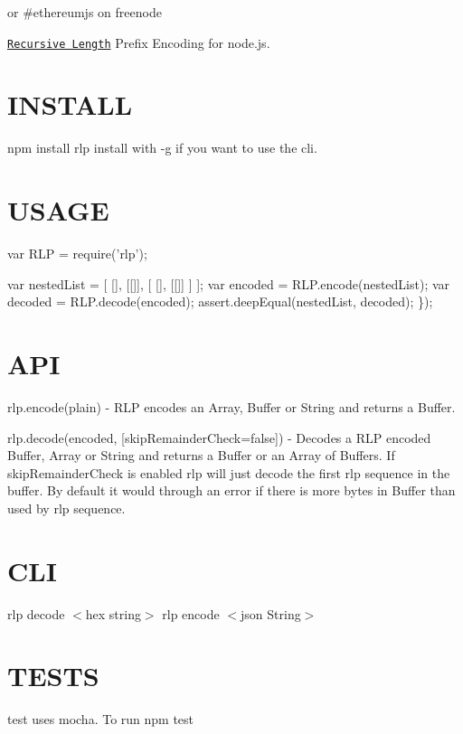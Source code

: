 \href{https://github.com/feross/standard}{\tt } \href{https://travis-ci.org/wanderer/rlp}{\tt } \href{https://gitter.im/ethereum/ethereumjs-lib?utm_source=badge&utm_medium=badge&utm_campaign=pr-badge}{\tt } or \#ethereumjs on freenode

\href{https://github.com/ethereum/wiki/wiki/RLP}{\tt Recursive Length} Prefix Encoding for node.\+js.

\section*{I\+N\+S\+T\+A\+LL }

{\ttfamily npm install rlp} install with {\ttfamily -\/g} if you want to use the cli.

\section*{U\+S\+A\+GE }


\begin{DoxyCode}
var RLP = require('rlp'); 

var nestedList = [ [], [[]], [ [], [[]] ] ];
var encoded = RLP.encode(nestedList);
var decoded = RLP.decode(encoded);
  assert.deepEqual(nestedList, decoded);
\});
\end{DoxyCode}


\section*{A\+PI }

{\ttfamily rlp.\+encode(plain)} -\/ R\+LP encodes an {\ttfamily Array}, {\ttfamily Buffer} or {\ttfamily String} and returns a {\ttfamily Buffer}.

{\ttfamily rlp.\+decode(encoded, \mbox{[}skip\+Remainder\+Check=false\mbox{]})} -\/ Decodes a R\+LP encoded {\ttfamily Buffer}, {\ttfamily Array} or {\ttfamily String} and returns a {\ttfamily Buffer} or an {\ttfamily Array} of {\ttfamily Buffers}. If {\ttfamily skip\+Remainder\+Check} is enabled {\ttfamily rlp} will just decode the first rlp sequence in the buffer. By default it would through an error if there is more bytes in Buffer than used by rlp sequence.

\section*{C\+LI }

{\ttfamily rlp decode $<$hex string$>$} {\ttfamily rlp encode $<$json String$>$}

\section*{T\+E\+S\+TS }

test uses mocha. To run {\ttfamily npm test} 